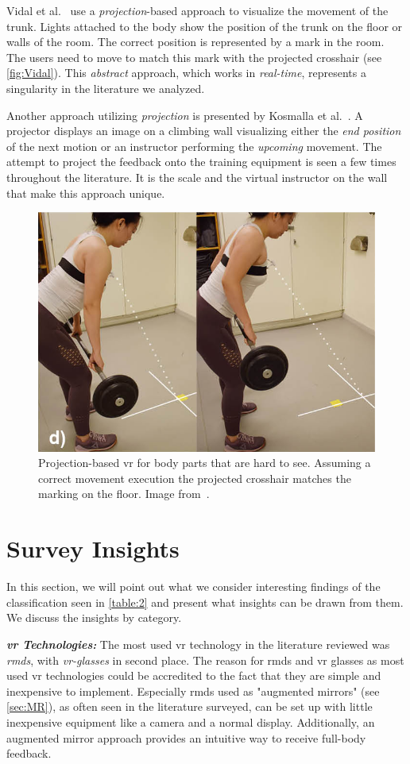 Vidal et al.~\cite{vidal2020blo} use a \emph{projection}-based approach to visualize the movement of the trunk. Lights attached to the body show the position of the trunk on the floor or walls of the room. The correct position is represented by a mark in the room. The users need to move to match this mark with the projected crosshair (see \autoref{fig:Vidal}). This \emph{abstract} approach, which works in \emph{real-time}, represents a singularity in the literature we analyzed.

Another approach utilizing \emph{projection} is presented by Kosmalla et al.~\cite{kosmalla2017cvi}. A projector displays an image on a climbing wall visualizing either the \emph{end position} of the next motion or an instructor performing the \emph{upcoming} movement. The attempt to project the feedback onto the training equipment is seen a few times throughout the literature. It is the scale and the virtual instructor on the wall that make this approach unique.
\begin{figure}[h!bt]
    \centering
    \includegraphics[width=0.6\linewidth]{pictures/Vidal.png}
    \caption[Projection-based \acrshort{vr} for body parts that are hard to see.]{Projection-based \acrshort{vr} for body parts that are hard to see. Assuming a correct movement execution the projected crosshair matches the marking on the floor. Image from~\cite{vidal2020blo}.\label{fig:Vidal}}
\end{figure}

\section{Survey Insights\label{sec:tvcg:insights}}
In this section, we will point out what we consider interesting findings of the classification seen in \autoref{table:2} and present what insights can be drawn from them. We discuss the insights by category.


\textbf{\emph{\acrshort{vr} Technologies:}} The most used \acrshort{vr} technology in the literature reviewed was \emph{\acrshort{rmd}s}, with \emph{\acrshort{vr}-glasses} in second place. The reason for \acrshort{rmd}s and \acrshort{vr} glasses as most used \acrshort{vr} technologies could be accredited to the fact that they are simple and inexpensive to implement. Especially \acrshort{rmd}s used as "augmented mirrors" (see \autoref{sec:MR}), as often seen in the literature surveyed, can be set up with little inexpensive equipment like a camera and a normal display. Additionally, an augmented mirror approach provides an intuitive way to receive full-body feedback.

